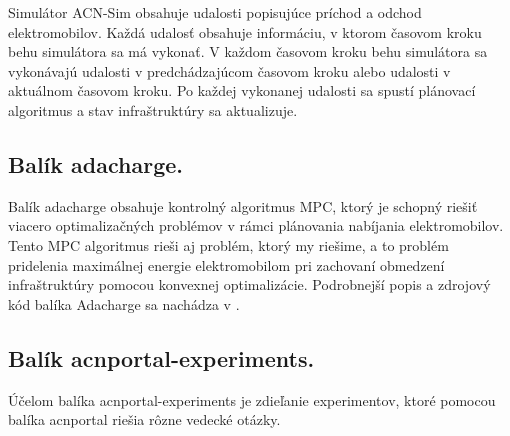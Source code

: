 Simulátor ACN-Sim obsahuje udalosti popisujúce príchod a odchod elektromobilov. Každá udalosť obsahuje informáciu, v ktorom časovom kroku behu simulátora sa má vykonať. V každom časovom kroku behu simulátora sa vykonávajú udalosti v predchádzajúcom časovom kroku alebo udalosti v aktuálnom časovom kroku. Po každej vykonanej udalosti sa spustí plánovací algoritmus a stav infraštruktúry sa aktualizuje. \cite{lee2021acnsim}









\subsection{Balík adacharge.}


Balík adacharge obsahuje kontrolný algoritmus MPC, ktorý je schopný riešiť viacero optimalizačných problémov v rámci plánovania nabíjania elektromobilov. Tento MPC algoritmus rieši aj problém, ktorý my riešime, a to problém pridelenia maximálnej energie elektromobilom pri zachovaní obmedzení infraštruktúry pomocou konvexnej optimalizácie. Podrobnejší popis a zdrojový kód balíka Adacharge sa nachádza v \cite{adachargerepository}.
\subsection{Balík acnportal-experiments.}
Účelom balíka acnportal-experiments je zdieľanie experimentov, ktoré pomocou balíka acnportal riešia rôzne vedecké otázky.

